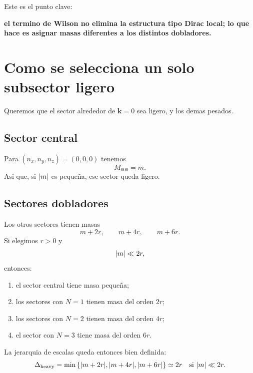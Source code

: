 Este es el punto clave:
\begin{displayquote}
\textbf{el termino de Wilson no elimina la estructura tipo Dirac local; lo que hace es asignar masas diferentes a los distintos dobladores.}
\end{displayquote}

\section{Como se selecciona un solo subsector ligero}
Queremos que el sector alrededor de \(\bm{k}=0\) sea ligero, y los demas pesados.

\subsection{Sector central}
Para \((n_x,n_y,n_z)=(0,0,0)\) tenemos
\begin{equation}
M_{000}=m.
\end{equation}
Asi que, si \(\abs{m}\) es peque\~na, ese sector queda ligero.

\subsection{Sectores dobladores}
Los otros sectores tienen masas
\begin{equation}
m+2r,\qquad m+4r,\qquad m+6r.
\end{equation}
Si elegimos \(r>0\) y
\begin{equation}
\abs{m}\ll 2r,
\label{c14:eq:window}
\end{equation}
entonces:
\begin{enumerate}[label=\arabic*.]
    \item el sector central tiene masa peque\~na;
    \item los sectores con \(N=1\) tienen masa del orden \(2r\);
    \item los sectores con \(N=2\) tienen masa del orden \(4r\);
    \item el sector con \(N=3\) tiene masa del orden \(6r\).
\end{enumerate}

La jerarquia de escalas queda entonces bien definida:
\begin{equation}
\Delta_{\text{heavy}}
=
\min\left\{
\abs{m+2r},
\abs{m+4r},
\abs{m+6r}
\right\}
\simeq 2r
\quad
\text{si } \abs{m}\ll 2r.
\label{c14:eq:gapheavy}
\end{equation}

